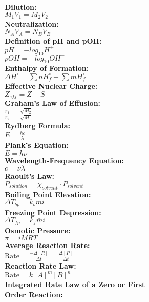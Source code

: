 \documentclass[12pt]{article}
\begin{document}
\\ \textbf{Dilution:}
    \\ \( M_1 V_1 = M_2 V_2 \)
\\ \textbf{Neutralization:}
    \\ \( N_A V_A = N_B V_B \)
\\ \textbf{Definition of pH and pOH:}
    \\ \( pH = -log_{10}{ H^+ } \)
    \\ \( pOH = -log_{10}{ OH^- } \)
\\ \textbf{Enthalpy of Formation:}
    \\ \( \Delta H^{\circ} = \displaystyle\sum{ n H^{\circ}_f } - \displaystyle\sum{ m H^{\circ}_f } \)
\\ \textbf{Effective Nuclear Charge:}
    \\ \( Z_{eff} = Z - S \)
\\ \textbf{Graham’s Law of Effusion:}
    \\ \( \displaystyle\frac{ r_1 }{ r_2 } = \displaystyle\frac{ \sqrt{ M_2 } }{ \sqrt{ M_1 } } \)
\\ \textbf{Rydberg Formula:}
    \\ \( E = \displaystyle\frac{ hc }{ \lambda } \)
\\ \textbf{Plank’s Equation:}
    \\ \( E = h \nu \)
\\ \textbf{Wavelength-Frequency Equation:}
    \\ \( c = \nu \lambda \)
\\ \textbf{Raoult’s Law:}
    \\ \( P_{solution} = \chi_{solvent} \cdot P_{solvent} \)
\\ \textbf{Boiling Point Elevation:}
    \\ \( \Delta T_{bp} = k_b \bar{m} i \)
\\ \textbf{Freezing Point Depression:}
    \\ \( \Delta T_{fp} = k_f \bar{m} i \)
\\ \textbf{Osmotic Pressure:}
    \\ \( \pi = iMRT \)
\\ \textbf{Average Reaction Rate:}
    \\ \( \text{Rate} = \displaystyle\frac{ - \Delta [ R ] }{ \Delta t } = \displaystyle\frac{ \Delta [ P ] }{ \Delta t } \)
\\ \textbf{Reaction Rate Law:}
    \\ \( \text{Rate} = k [ A ]^m [ B ]^n \)
\\ \textbf{Integrated Rate Law of a Zero or First \\Order Reaction:}
\end{document}
